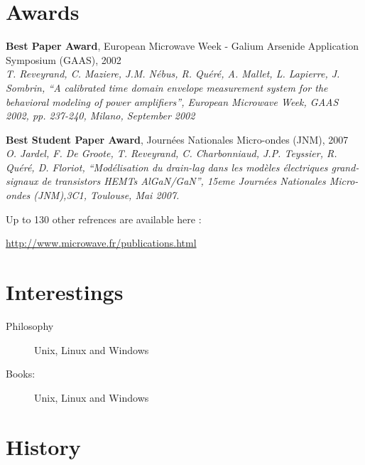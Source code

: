\documentclass[margin,line]{resume}
\begin{document}
\begin{resume}
  \section{\mysidestyle Awards}\vspace{4mm}
  \begin{list2}
  \item \textbf{Best Paper Award}, European Microwave Week - Galium
    Arsenide Application Symposium (GAAS), 2002 \\
    \textsl{\footnotesize{T. Reveyrand, C. Maziere, J.M. N\'ebus, R.
        Qu\'er\'e, A. Mallet, L. Lapierre, J. Sombrin, ``A calibrated
        time domain envelope measurement system for the behavioral
        modeling of power amplifiers'', European Microwave Week, GAAS
    2002, pp. 237-240, Milano, September 2002}}
    \vspace{1mm}
  \item \textbf{Best Student Paper Award}, Journ\'ees Nationales
    Micro-ondes (JNM), 2007 \\
    \textsl{\footnotesize{
        O. Jardel, F. De Groote, T. Reveyrand, C. Charbonniaud, J.P.
        Teyssier, R. Qu\'er\'e, D. Floriot, ``Mod\'elisation du drain-lag
        dans les mod\`eles \'electriques grand-signaux de transistors
        HEMTs AlGaN/GaN'', 15eme Journ\'ees Nationales Micro-ondes
    (JNM),3C1, Toulouse, Mai 2007.}}
  \end{list2}

  Up to 130 other refrences are available here : \\
  \vspace{-8mm}

  \href{http://www.microwave.fr/publications.html}{http://www.microwave.fr/publications.html}

  \section{\mysidestyle Interestings}\vspace{2mm}
  \begin{description}
    \item[Philosophy] Unix, Linux and Windows
    \item[Books:] Unix, Linux and Windows
  \end{description}

  \vfill


  \section{\mysidestyle History}\vspace{2mm}



\end{resume}
\end{document}
